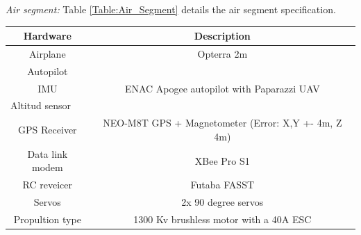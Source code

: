 \textit{Air segment:} Table \ref{Table:Air_Segment} details the air segment specification.
\begin{table}[H]
\centering
\begin{tabular}{|c|c|}
\hline
Hardware                             & Description                                                                                                                                                          \\ \hline
Airplane                             & Opterra 2m                                                                                                                                                           \\ \hline
Autopilot                            & \multirow{3}{*}{ENAC Apogee autopilot with Paparazzi UAV}                                                                                                          \\ \cline{1-1}
IMU                                  &                                                                                                                                                                      \\ \cline{1-1}
\multicolumn{1}{|l|}{Altitud sensor} &                                                                                                                                                                      \\ \hline
GPS Receiver                         & NEO-M8T GPS + Magnetometer (Error: X,Y +- 4m, Z 4m)                                                                                                                                          \\ \hline
Data link modem                      & XBee Pro S1                                                                                                                                                          \\ \hline
RC reveicer                          & Futaba FASST                                                                                                                                                         \\ \hline
Servos                               & 2x 90 degree servos                                                                                                                                                  \\ \hline
Propultion type                      & 1300 Kv brushless motor with a 40A ESC                                                                                                                               \\ \hline

\end{tabular}
\end{table}
